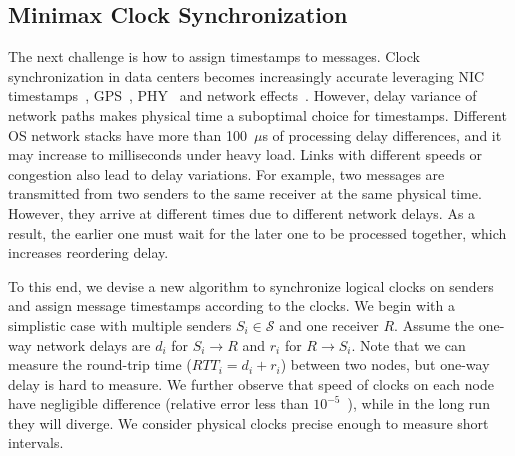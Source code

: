 \subsection{Minimax Clock Synchronization}
\label{sec:sync}


The next challenge is how to assign timestamps to messages.
Clock synchronization in data centers becomes increasingly accurate leveraging NIC timestamps~\cite{correll2005design}, GPS~\cite{corbett2013spanner}, PHY~\cite{lee2016globally} and network effects~\cite{geng2018exploiting}.
However, delay variance of network paths makes physical time a suboptimal choice for timestamps.
Different OS network stacks have more than 100~$\mu$s of processing delay differences, and it may increase to milliseconds under heavy load.
Links with different speeds or congestion also lead to delay variations.
For example, two messages are transmitted from two senders to the same receiver at the same physical time.
However, they arrive at different times due to different network delays.
As a result, the earlier one must wait for the later one to be processed together, which increases reordering delay.

To this end, we devise a new algorithm to synchronize logical clocks on senders and assign message timestamps according to the clocks.
We begin with a simplistic case with multiple senders $S_i \in \mathcal{S}$ and one receiver $R$.
Assume the one-way network delays are $d_i$ for $S_i \rightarrow R$ and $r_i$ for $R \rightarrow S_i$.
Note that we can measure the round-trip time ($RTT_i = d_i + r_i$) between two nodes, but one-way delay is hard to measure.
We further observe that speed of clocks on each node have negligible difference (relative error less than $10^{-5}$~\cite{corbett2013spanner,geng2018exploiting}), while in the long run they will diverge.
We consider physical clocks precise enough to measure short intervals.

